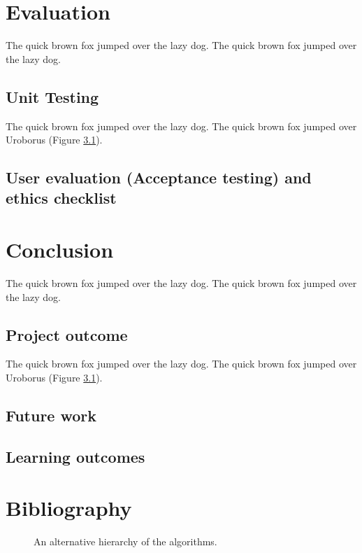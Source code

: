 \documentclass{l4proj}
\begin{document}
\chapter{Evaluation}
The quick brown fox jumped over the lazy dog.
The quick brown fox jumped over the lazy dog.

\section{Unit Testing}
The quick brown fox jumped over the lazy dog.
The quick brown fox jumped over Uroborus (Figure \ref{uroborus}).

\section{User evaluation (Acceptance testing) and ethics checklist}

\chapter{Conclusion}
The quick brown fox jumped over the lazy dog.
The quick brown fox jumped over the lazy dog.

\section{Project outcome}
The quick brown fox jumped over the lazy dog.
The quick brown fox jumped over Uroborus (Figure \ref{uroborus}).

\section{Future work}

\section{Learning outcomes}

\chapter{Bibliography}

\begin{figure}
\centering
\vspace{-30mm}
\caption{An alternative hierarchy of the algorithms.}
\label{uroborus}
\end{figure}
\end{document}
